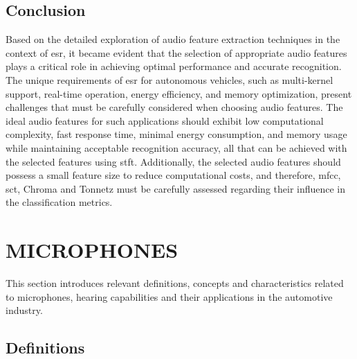 


\subsection{Conclusion}
\label{subsec:audio_fundamentals_conclusion}

Based on the detailed exploration of audio feature extraction techniques in the context of \gls{esr}, it became evident that the selection of appropriate audio features plays a critical role in achieving optimal performance and accurate recognition. The unique requirements of \gls{esr} for autonomous vehicles, such as multi-kernel support, real-time operation, energy efficiency, and memory optimization, present challenges that must be carefully considered when choosing audio features. The ideal audio features for such applications should exhibit low computational complexity, fast response time, minimal energy consumption, and memory usage while maintaining acceptable recognition accuracy, all that can be achieved with the selected features using \gls{stft}. Additionally, the selected audio features should possess a small feature size to reduce computational costs, and therefore, \gls{mfcc}, \gls{sct}, Chroma and Tonnetz must be carefully assessed regarding their influence in the classification metrics.


\section{MICROPHONES}
\label{sec:frmwk_microphones}

This section introduces relevant definitions, concepts and characteristics related to microphones, hearing capabilities and their applications in the automotive industry.


\subsection{Definitions}
\label{subsec:microphones_definitions}

